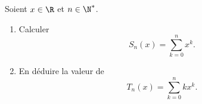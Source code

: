 Soient $x\in \R$ et $n\in \N^*$.
	\begin{enumerate}
		\item Calculer \[ S_n(x) = \sum_{k=0}^n x^k.\]
		\item En déduire la valeur de $$T_n(x) = \sum_{k=0}^n kx^k.$$
	\end{enumerate}